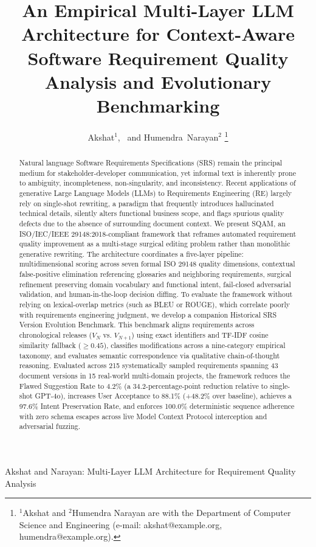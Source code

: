 \documentclass[journal]{IEEEtran}
\begin{document}
\title{An Empirical Multi-Layer LLM Architecture for Context-Aware Software Requirement Quality Analysis and Evolutionary Benchmarking}

\author{Akshat$^{1}$,~ and Humendra~Narayan$^{2}$%
\thanks{$^{1}$Akshat and $^{2}$Humendra Narayan are with the Department of Computer Science and Engineering (e-mail: akshat@example.org, humendra@example.org).}}

%
{Akshat and Narayan: Multi-Layer LLM Architecture for Requirement Quality Analysis}

\maketitle

\begin{abstract}
Natural language Software Requirements Specifications (SRS) remain the principal medium for stakeholder-developer communication, yet informal text is inherently prone to ambiguity, incompleteness, non-singularity, and inconsistency. Recent applications of generative Large Language Models (LLMs) to Requirements Engineering (RE) largely rely on single-shot rewriting, a paradigm that frequently introduces hallucinated technical details, silently alters functional business scope, and flags spurious quality defects due to the absence of surrounding document context. We present SQAM, an ISO/IEC/IEEE 29148:2018-compliant framework that reframes automated requirement quality improvement as a multi-stage surgical editing problem rather than monolithic generative rewriting. The architecture coordinates a five-layer pipeline: multidimensional scoring across seven formal ISO 29148 quality dimensions, contextual false-positive elimination referencing glossaries and neighboring requirements, surgical refinement preserving domain vocabulary and functional intent, fail-closed adversarial validation, and human-in-the-loop decision diffing. To evaluate the framework without relying on lexical-overlap metrics (such as BLEU or ROUGE), which correlate poorly with requirements engineering judgment, we develop a companion Historical SRS Version Evolution Benchmark. This benchmark aligns requirements across chronological releases ($V_N$ vs. $V_{N+1}$) using exact identifiers and TF-IDF cosine similarity fallback ($\ge 0.45$), classifies modifications across a nine-category empirical taxonomy, and evaluates semantic correspondence via qualitative chain-of-thought reasoning. Evaluated across 215 systematically sampled requirements spanning 43 document versions in 15 real-world multi-domain projects, the framework reduces the Flawed Suggestion Rate to 4.2\% (a 34.2-percentage-point reduction relative to single-shot GPT-4o), increases User Acceptance to 88.1\% (+48.2\% over baseline), achieves a 97.6\% Intent Preservation Rate, and enforces 100.0\% deterministic sequence adherence with zero schema escapes across live Model Context Protocol interception and adversarial fuzzing.
\end{abstract}
\end{document}
